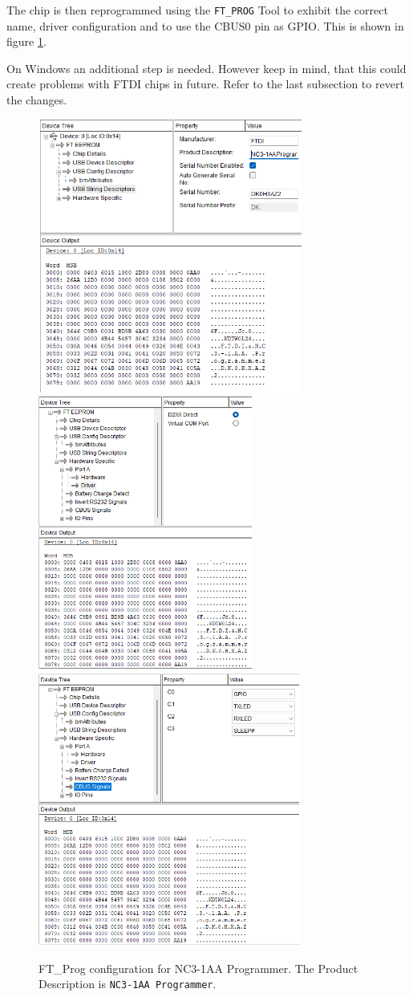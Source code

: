The chip is then reprogrammed using the \texttt{FT\_PROG} Tool to exhibit the correct name, driver configuration and to use the CBUS0 pin as GPIO. This is shown in figure \ref{fig_nc31AA_config}. 

On Windows an additional step is needed. However keep in mind, that this could create problems with FTDI chips in future. Refer to the last subsection to revert the changes. 
\begin{figure}
		\centering
		\includegraphics[height=9cm]{img/FT_Prog_1}
		\includegraphics[height=9cm]{img/FT_Prog_2}
		\includegraphics[height=9cm]{img/FT_Prog_3}
		\caption{FT\_Prog configuration for NC3-1AA Programmer. The Product Description is \texttt{NC3-1AA Programmer}.}
		\label{fig_nc31AA_config}	
\end{figure}


